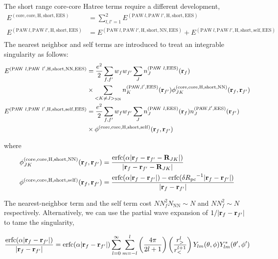\documentclass[paper=a4, fontsize=11pt]{article} %
\numberwithin{equation}{section} %
\numberwithin{figure}{section} %
\numberwithin{table}{section} %
\newcommand{\br}{{\bf{r}}}
\newcommand{\bR}{{\bf{R}}}
\newcommand{\rEES}{{\mathrm{EES}}}
\newcommand{\rcore}{{\mathrm{core}}}
\newcommand{\rNN}{{\mathrm{NN}}}
\newcommand{\rself}{{\mathrm{self}}}
\newcommand{\rshort}{{\mathrm{short}}}
\newcommand{\rerfc}{{\mathrm{erfc}}}
\newcommand{\rP}{{\mathrm{PAW}}}
\newcommand{\rH}{{\mathrm{H}}}
\newcommand{\Rpc}{{R_{\mathrm{pc}}}}
\begin{document}
The short range core-core Hatree terms require a different development,
\begin{equation}
\begin{split}
E^{(\rcore,\rcore,\rH,\rshort,\rEES)} & = \sum_{l,l'=1}^2 E^{(\rP\ l,\rP\ l',\rH,\rshort,\rEES)}\\
E^{(\rP\ l,\rP\ l',\rH,\rshort,\rEES)} &= E^{(\rP\ l,\rP\ l',\rH,\rshort,\rNN,\rEES)}+E^{(\rP\ l,\rP\ l',\rH,\rshort,\rself,\rEES)}\\
\end{split}
\end{equation}
The nearest neighbor and self terms are introduced to treat an integrable singularity as follows:
\begin{equation}
\begin{split}
E^{(\rP\ l,\rP\ l',\rH,\rshort,\rNN,\rEES)}
&= \frac{e^2}{2}\sum_{f,f'} w_f w_{f'} \sum_J n_J^{(\rP\ l,\rEES)}(\br_f)\\
&\times \sum_{<K \neq J>_\rNN}n_K^{(\rP,l',\rEES)}(\br_{f'}) \phi_{JK}^{(\rcore,\rcore,\rH,\rshort,\rNN)}(\br_f,\br_{f'})\\
E^{(\rP\ l,\rP\ l',\rH,\rshort,\rself,\rEES)}
&= \frac{e^2}{2}\sum_{f,f'} w_f w_{f'} \sum_J n_J^{(\rP\ l,\rEES)}(\br_f) n_J^{(\rP,l',\rEES)}(\br_{f'})\\
&\times \phi^{(\rcore,\rcore,\rH,\rshort,\rself)}(\br_f,\br_{f'})\\
\end{split}
\end{equation}

where
\begin{equation}
\begin{split}
\phi_{JK}^{(\rcore,\rcore,\rH,\rshort,\rNN)}(\br_f,\br_{f'}) &= \frac{\rerfc(\alpha|\br_f-\br_{f'}-\bR_{JK}|)}{|\br_f-\br_{f'}-\bR_{JK}|} \\
\phi^{(\rcore,\rcore,\rH,\rshort,\rself)}(\br_f,\br_{f'})&=\frac{\rerfc(\alpha|\br_f-\br_{f'}|)-\rerfc(\delta \Rpc^{-1}|\br_f-\br_{f'}|)}{|\br_f-\br_{f'}|}\\
\end{split}
\end{equation}


The nearest-neighbor term and the self term cost $N N_f^2N_\rNN \sim N$ and $N N_f^2 \sim N$ respectively. Alternatively, we can use the partial wave expansion of $1/|\br_f-\br_{f'}|$ to tame the singularity,

\begin{equation}
\frac{\rerfc(\alpha|\br_f-\br_{f'}|)}{|\br_f-\br_{f'}|} = \rerfc(\alpha|\br_f-\br_{f'}|)\sum_{l=0}^\infty \sum_{m=-l}^l \left( \frac{4\pi}{2l+1}\right) \left( \frac{r_{>}^{l}}{r_{<}^{l+1}} \right) Y_{lm} (\theta,\phi) Y_{lm}^* (\theta',\phi') 
\end{equation}
\end{document}
